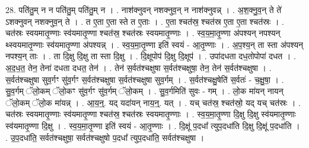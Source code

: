 \documentclass[17pt]{extarticle}
\begin{document}
28. पति॑तु॒म् न न पति॑तु॒म् पति॑तु॒म् न । . नाश॑क्नुवन् नशक्नुव॒न् न नाश॑क्नुवन्न् । . अ॒श॒क्नु॒व॒न् ते ते॑ ऽशक्नुवन् नशक्नुव॒न् ते । . त ए॒ता ए॒ता स्ते त ए॒ताः । . ए॒ता श्चत॑स्र॒ श्चत॑स्र ए॒ता ए॒ता श्चत॑स्रः । . चत॑स्रः स्वयमातृ॒ण्णाः स्व॑यमातृ॒ण्णा श्चत॑स्र॒ श्चत॑स्रः स्वयमातृ॒ण्णाः । . स्व॒य॒मा॒तृ॒ण्णा अ॑पश्यन् नपश्यन् थ्स्वयमातृ॒ण्णाः स्व॑यमातृ॒ण्णा अ॑पश्यन्न् । . स्व॒य॒मा॒तृ॒ण्णा इति॑ स्वयं - आ॒तृ॒ण्णाः । . अ॒प॒श्य॒न् ता स्ता अ॑पश्यन् नपश्य॒न् ताः । . ता दि॒क्षु दि॒क्षु ता स्ता दि॒क्षु । . दि॒क्षूपोप॑ दि॒क्षु दि॒क्षूप॑ । . उपा॑दधता दध॒तोपोपा॑ दधत । . अ॒द॒ध॒त॒ तेन॒ तेना॑ दधता दधत॒ तेन॑ । . तेन॑ स॒र्वत॑श्चक्षुषा स॒र्वत॑श्चक्षुषा॒ तेन॒ तेन॑ स॒र्वत॑श्चक्षुषा । . स॒र्वत॑श्चक्षुषा सुव॒र्गꣳ सु॑व॒र्गꣳ स॒र्वत॑श्चक्षुषा स॒र्वत॑श्चक्षुषा सुव॒र्गम् । . स॒र्वत॑श्चक्षु॒षेति॑ स॒र्वतः॑ - च॒क्षु॒षा॒ । . सु॒व॒र्गम् ॅलो॒कम् ॅलो॒कꣳ सु॑व॒र्गꣳ सु॑व॒र्गम् ॅलो॒कम् । . सु॒व॒र्गमिति॑ सुवः - गम् । . लो॒क मा॑यन् नायन् ॅलो॒कम् ॅलो॒क मा॑यन्न् । . आ॒य॒न्॒. यद् यदा॑यन् नाय॒न्॒. यत् । . यच् चत॑स्र॒ श्चत॑स्रो॒ यद् यच् चत॑स्रः । . चत॑स्रः स्वयमातृ॒ण्णाः स्व॑यमातृ॒ण्णा श्चत॑स्र॒ श्चत॑स्रः स्वयमातृ॒ण्णाः । . स्व॒य॒मा॒तृ॒ण्णा दि॒क्षु दि॒क्षु स्व॑यमातृ॒ण्णाः स्व॑यमातृ॒ण्णा दि॒क्षु । . स्व॒य॒मा॒तृ॒ण्णा इति॑ स्वयं - आ॒तृ॒ण्णाः । . दि॒क्षू॑ प॒दधा᳚ त्युप॒दधा॑ति दि॒क्षु दि॒क्षू॑ प॒दधा॑ति । . उ॒प॒दधा॑ति॒ सर्वत॑श्चक्षुषा॒ सर्वत॑श्चक्षुषो प॒दधा᳚ त्युप॒दधा॑ति॒ सर्वत॑श्चक्षुषा । \newline
\end{document}
